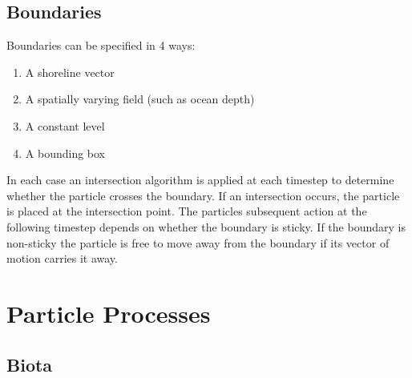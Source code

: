 \documentclass[a4paper]{article}
\begin{document}
\subsection{Boundaries}
Boundaries can be specified in 4 ways:
\begin{enumerate}
\item A shoreline vector
\item A spatially varying field (such as ocean depth) 
\item A constant level
\item A bounding box
\end{enumerate}
In each case an intersection algorithm is applied at each timestep to determine whether the particle crosses the boundary.
If an intersection occurs, the particle is placed at the intersection point.
The particles subsequent action at the following timestep depends on whether the boundary is sticky.
If the boundary is non-sticky the particle is free to move away from the boundary if its vector of motion carries it away.

\section{Particle Processes}
\subsection{Biota}
\end{document}
